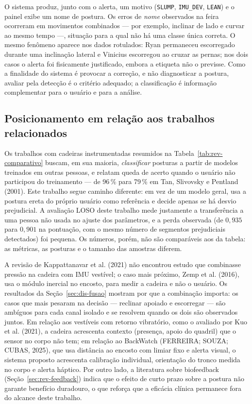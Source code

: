 O sistema produz, junto com o alerta, um motivo (\texttt{SLUMP},
\texttt{IMU\_DEV}, \texttt{LEAN}) e o painel exibe um nome de postura. Os
erros de \emph{nome} observados na feira ocorreram em movimentos combinados ---
por exemplo, inclinar de lado e curvar ao mesmo tempo ---, situação para a
qual não há uma classe única correta. O mesmo fenômeno aparece nos dados
rotulados: Ryan permaneceu escorregado durante uma inclinação lateral e
Vinicius escorregou ao cruzar as pernas; nos dois casos o alerta foi
fisicamente justificado, embora a etiqueta não o previsse. Como a finalidade
do sistema é provocar a correção, e não diagnosticar a postura, avaliar pela
detecção é o critério adequado; a classificação é informação complementar
para o usuário e para a análise.

\subsection{Posicionamento em relação aos trabalhos relacionados}
\label{sec:dis-relacionados}

Os trabalhos com cadeiras instrumentadas resumidos na
Tabela~\ref{tab:rev-comparativo} buscam, em sua maioria, \emph{classificar}
posturas a partir de modelos treinados em outras pessoas, e relatam queda de
acerto quando o usuário não participou do treinamento --- de 96\,\% para
79\,\% em Tan, Slivovsky e Pentland (2001). Este trabalho segue caminho
diferente: em vez de um modelo geral, usa a postura ereta do próprio usuário
como referência e decide apenas se há desvio prejudicial. A avaliação LOSO
deste trabalho mede justamente a transferência a uma pessoa não usada no
ajuste dos parâmetros, e a perda observada (de $0{,}935$ para $0{,}901$ na
pontuação, com o mesmo número de segmentos prejudiciais detectados) foi
pequena. Os números, porém, não são comparáveis aos da tabela: as métricas,
as posturas e o tamanho das amostras diferem.

A revisão de Kappattanavar et al. (2021) não encontrou estudo que combinasse
pressão na cadeira com IMU vestível; o caso mais próximo, Zemp et al. (2016),
usa o módulo inercial no encosto, para medir a cadeira e não o usuário. Os
resultados da Seção~\ref{sec:dis-fusao} mostram por que a combinação importa:
os casos que mais pesaram na decisão --- reclinar apoiado e escorregar ---
são ambíguos para cada canal isolado e se resolvem quando os dois são
observados juntos. Em relação aos vestíveis com retorno vibratório, como o
avaliado por Kuo et al. (2021), a cadeira acrescenta contexto (presença,
apoio do quadril) que o sensor no corpo não tem; em relação ao BackWatch
(FERREIRA; SOUZA; CUBAS, 2025), que usa distância ao encosto com limiar fixo
e alerta visual, o sistema proposto acrescenta calibração individual,
orientação do tronco medida no corpo e alerta háptico. Por outro lado, a
literatura sobre biofeedback (Seção~\ref{sec:rev-feedback}) indica que o
efeito de curto prazo sobre a postura não garante benefício duradouro, o que
reforça que a eficácia clínica permanece fora do alcance deste trabalho.

